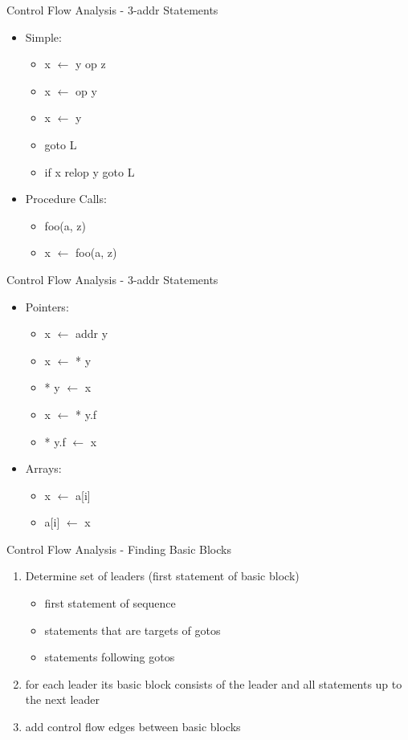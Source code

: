 \documentclass[mcgill,slideColor,colorBG,pdf]{prosper}
\begin{document}
\begin{slide} {Control Flow Analysis - 3-addr Statements}
\begin{itemize}
\item Simple:
\begin{itemize}
\item x $\leftarrow$ y op z
\item x $\leftarrow$ op y
\item x $\leftarrow$ y
\item goto L
\item if x relop y goto L
\end{itemize}
\item Procedure Calls:
\begin{itemize}
\item foo(a, z)
\item x $\leftarrow$ foo(a, z)
\end{itemize}
\end{itemize}
\end{slide}

\begin{slide} {Control Flow Analysis - 3-addr Statements}
\begin{itemize}
\item Pointers:
\begin{itemize}
\item x $\leftarrow$ addr y 
\item x $\leftarrow$ * y
\item * y $\leftarrow$ x
\item x $\leftarrow$ * y.f
\item * y.f $\leftarrow$ x
\end{itemize}
\item Arrays:
\begin{itemize}
\item x $\leftarrow$ a[i]
\item a[i] $\leftarrow$ x
\end{itemize}
\end{itemize}
\end{slide}

\begin{slide} {Control Flow Analysis - Finding Basic Blocks}
\begin{enumerate}
\item Determine set of leaders (first statement of basic block)
\begin{itemize}
\item first statement of sequence
\item statements that are targets of gotos
\item statements following gotos
\end{itemize}
\item for each leader its basic block consists of the leader and all statements up to the next leader
\item add control flow edges between basic blocks
\end{enumerate}
\end{slide}
\end{document}
